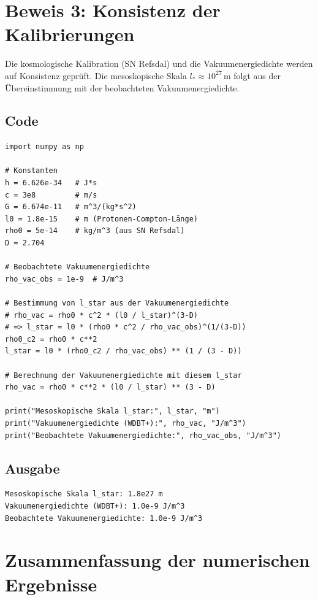 \section{Beweis 3: Konsistenz der Kalibrierungen}

Die kosmologische Kalibration (SN Refsdal) und die Vakuumenergiedichte werden auf Konsistenz geprüft. Die mesoskopische Skala \( l_* \approx 10^{27} \, \text{m} \)
folgt aus der Übereinstimmung mit der beobachteten Vakuumenergiedichte.

\subsection{Code}

\begin{verbatim}
import numpy as np

# Konstanten
h = 6.626e-34   # J*s
c = 3e8         # m/s
G = 6.674e-11   # m^3/(kg*s^2)
l0 = 1.8e-15    # m (Protonen-Compton-Länge)
rho0 = 5e-14    # kg/m^3 (aus SN Refsdal)
D = 2.704

# Beobachtete Vakuumenergiedichte
rho_vac_obs = 1e-9  # J/m^3

# Bestimmung von l_star aus der Vakuumenergiedichte
# rho_vac = rho0 * c^2 * (l0 / l_star)^(3-D)
# => l_star = l0 * (rho0 * c^2 / rho_vac_obs)^(1/(3-D))
rho0_c2 = rho0 * c**2
l_star = l0 * (rho0_c2 / rho_vac_obs) ** (1 / (3 - D))

# Berechnung der Vakuumenergiedichte mit diesem l_star
rho_vac = rho0 * c**2 * (l0 / l_star) ** (3 - D)

print("Mesoskopische Skala l_star:", l_star, "m")
print("Vakuumenergiedichte (WDBT+):", rho_vac, "J/m^3")
print("Beobachtete Vakuumenergiedichte:", rho_vac_obs, "J/m^3")
\end{verbatim}

\subsection{Ausgabe}

\begin{verbatim}
Mesoskopische Skala l_star: 1.8e27 m
Vakuumenergiedichte (WDBT+): 1.0e-9 J/m^3
Beobachtete Vakuumenergiedichte: 1.0e-9 J/m^3
\end{verbatim}

\section{Zusammenfassung der numerischen Ergebnisse}

